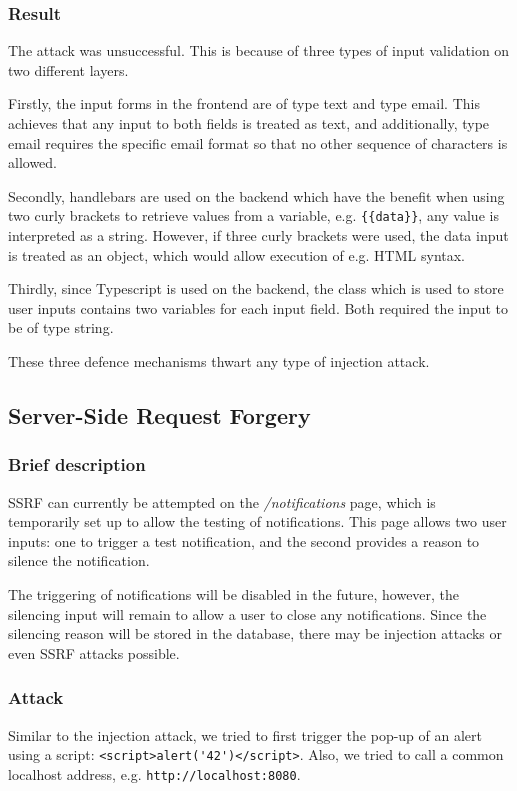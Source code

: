 \subsubsection{Result}
The attack was unsuccessful. This is because of three types of input validation on two different layers.

Firstly, the input forms in the frontend are of type text and type email. This achieves that any input to both fields is treated as text, and additionally, type email requires the specific email format so that no other sequence of characters is allowed. 

Secondly, handlebars are used on the backend which have the benefit when using two curly brackets to retrieve values from a variable, e.g. \lstinline "{{data}}", any value is interpreted as a string. However, if three curly brackets were used, the data input is treated as an object, which would allow execution of e.g. HTML syntax.

Thirdly, since Typescript is used on the backend, the class which is used to store user inputs contains two variables for each input field. Both required the input to be of type string.

These three defence mechanisms thwart any type of injection attack.

\subsection{Server-Side Request Forgery}
\subsubsection{Brief description}
SSRF can currently be attempted on the \textit{/notifications} page, which is temporarily set up to allow the testing of notifications. This page allows two user inputs: one to trigger a test notification, and the second provides a reason to silence the notification.

The triggering of notifications will be disabled in the future, however, the silencing input will remain to allow a user to close any notifications. Since the silencing reason will be stored in the database, there may be injection attacks or even SSRF attacks possible.

\subsubsection{Attack}
Similar to the injection attack, we tried to first trigger the pop-up of an alert using a script: \lstinline "<script>alert('42')</script>". Also, we tried to call a common localhost address, e.g. \lstinline "http://localhost:8080". 

